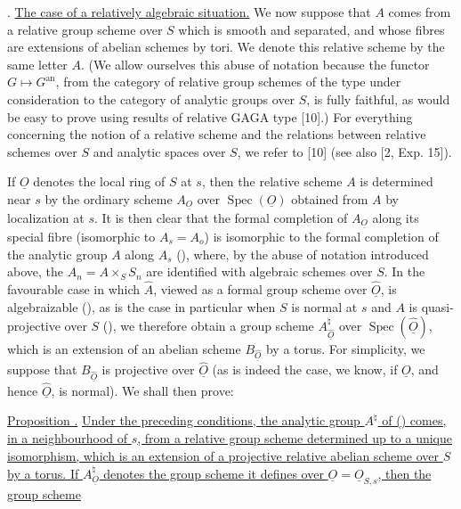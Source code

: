 \medskip
\noindent
{}. \underline{The case of a relatively algebraic situation.}
We now suppose that $A$ comes from a relative group scheme over $S$
which is smooth and separated, and whose fibres are extensions of
abelian schemes by tori.  We denote this relative scheme by the same
letter $A$.  (We allow ourselves this abuse of notation because the
functor $G\longmapsto G^{\mathrm{an}}$, from the category of relative
group schemes of the type under consideration to the category of
analytic groups over $S$, is fully faithful, as would be easy to prove
using results of relative GAGA type [10].)  For everything concerning
the notion of a relative scheme and the relations between relative
schemes over $S$ and analytic spaces over $S$, we refer to [10] (see
also [2, Exp. 15]).

If $\underline O$ denotes the local ring of $S$ at $s$, then the
relative scheme $A$ is determined near $s$ by the ordinary scheme
$A_{\underline O}$ over $\operatorname{Spec}(\underline O)$ obtained
from $A$ by localization at $s$.  It is then clear that the formal
completion of $A_{\underline O}$ along its special fibre (isomorphic to
$A_s=A_o$) is isomorphic to the formal completion of the analytic group
$A$ along $A_s$ (), where, by the abuse of notation introduced
above, the $A_n=A\times_S S_n$ are identified with algebraic schemes
over $S$.  In the favourable case in which $\hat A$, viewed as a formal
group scheme over $\hat{\underline O}$, is algebraizable (), as is
the case in particular when $S$ is normal at $s$ and $A$ is
quasi-projective over $S$ (), we therefore obtain a group scheme
$A^{\natural}_{\hat{\underline O}}$ over
$\operatorname{Spec}(\hat{\underline O})$, which is an extension of an
abelian scheme $B_{\hat{\underline O}}$ by a torus.  For simplicity, we
suppose that $B_{\hat{\underline O}}$ is projective over
$\hat{\underline O}$ (as is indeed the case, we know, if
$\underline O$, and hence $\hat{\underline O}$, is normal).  We shall
then prove:

\medskip
\noindent
\underline{Proposition .} \underline{Under the preceding
conditions, the analytic group $A^{\natural}$ of () comes, in a
neighbourhood of $s$, from a relative group scheme determined up to a
unique isomorphism, which is an extension of a projective relative
abelian scheme over $S$ by a torus.  If
$A^{\natural}_{\underline O}$ denotes the group scheme it defines over
$\underline O=\underline O_{S,s}$, then the group scheme}

